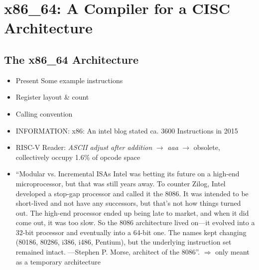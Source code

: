 \section{x86\_64: A Compiler for a CISC Architecture}

\subsection{The x86\_64 Architecture}

\begin{itemize}
	\item Present Some example instructions
	\item Register layout \& count
	\item Calling convention
	\item INFORMATION: x86: An intel blog stated ca. 3600 Instructions in 2015 \cite{Rodgers2017}
    \item RISC-V Reader: \emph{ASCII adjust after addition} $\rightarrow$ \emph{aaa} $\rightarrow$ obsolete, collectively occupy 1.6\% of opcode space\cite[p.~4]{Patterson2017}
	\item
	      \enquote{Modular vs. Incremental ISAs Intel was betting its future on a high-end microprocessor, but that was still years away.
		      To counter Zilog, Intel developed a stop-gap processor and called it the 8086. It was intended to be short-lived and not have any successors,
		      but that’s not how things turned out. The high-end processor ended up being late to market, and when it did come out, it was too slow.
		      So the 8086 architecture lived on—it evolved into a 32-bit processor and eventually into a 64-bit one.
		      The names kept changing (80186, 80286, i386, i486, Pentium), but the underlying instruction set remained intact. —Stephen P. Morse, architect of the 8086}\cite{Morse2017}.
              $\Rightarrow$ only meant as a temporary architecture
\end{itemize}

